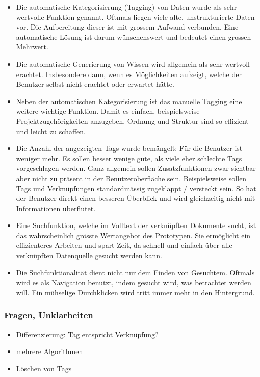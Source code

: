 \begin{itemize}
    \item Die automatische Kategorisierung (Tagging) von Daten wurde als sehr wertvolle Funktion genannt. Oftmals liegen viele alte, un\-struk\-tu\-rier\-te Daten vor. Die Aufbereitung dieser ist mit grossem Aufwand verbunden. Eine automatische Lösung ist darum wünsch\-ens\-wert und bedeutet einen grossen Mehrwert.
    \item Die automatische Generierung von Wissen wird allgemein als sehr wertvoll erachtet. Insbesondere dann, wenn es Möglichkeiten aufzeigt, welche der Benutzer selbst nicht erachtet oder erwartet hätte.
    \item Neben der automatischen Kategorisierung ist das manuelle Tagging eine weitere wichtige Funktion. Damit es einfach, beispielsweise Projektzugehörigkeiten anzugeben. Ordnung und Struktur sind so effizient und leicht zu schaffen.
    \item Die Anzahl der angezeigten Tags wurde bemängelt: Für die Benutzer ist weniger mehr. Es sollen besser wenige gute, als viele eher schlechte Tags vorgeschlagen werden. Ganz allgemein sollen Zusatzfunktionen zwar sichtbar aber nicht zu präsent in der Benutzeroberfläche sein. Beispielsweise sollen Tags und Verknüpfungen standardmässig zugeklappt / versteckt sein. So hat der Benutzer direkt einen besseren Überblick und wird gleichzeitig nicht mit Informationen überflutet.
    \item Eine Suchfunktion, welche im Volltext der verknüpften Dokumente sucht, ist das wahrscheinlich grösste Wertangebot des Prototypen. Sie ermöglicht ein effizienteres Arbeiten und spart Zeit, da schnell und einfach über alle verknüpften Datenquelle gesucht werden kann.
    \item Die Suchfunktionalität dient nicht nur dem Finden von Gesuchtem. Oftmals wird es als Navigation benutzt, indem gesucht wird, was betrachtet werden will. Ein mühselige Durchklicken wird tritt immer mehr in den Hintergrund.
\end{itemize}

\subsubsection{Fragen, Unklarheiten}

\begin{itemize}
    \item Differenzierung: Tag entspricht Verknüpfung?
    \item mehrere Algorithmen
    \item Löschen von Tags
\end{itemize}

